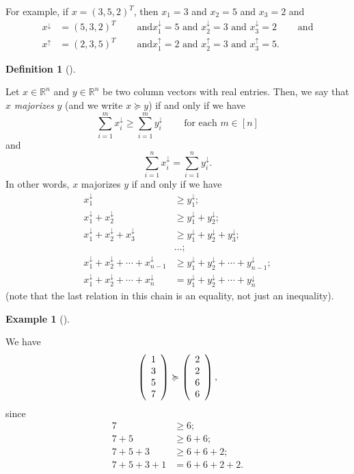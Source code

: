 \documentclass[numbers=enddot,12pt,final,onecolumn,notitlepage]{scrartcl}%
\numberwithin{exer}{subsection}
\theoremstyle{definition}
\newtheorem{defi}[theo]{Definition}
\newenvironment{definition}[1][]
{\begin{defi}[#1]\begin{leftbar}}
{\end{leftbar}\end{defi}}
\newtheorem{exam}[theo]{Example}
\newenvironment{example}[1][]
{\begin{exam}[#1]\begin{leftbar}}
{\end{leftbar}\end{exam}}
\let\sumnonlimits\sum
\renewcommand{\sum}{\sumnonlimits\limits}
\begin{document}
For example, if $x=\left(  3,5,2\right)  ^{T}$, then $x_{1}=3$ and $x_{2}=5$
and $x_{3}=2$ and%
\begin{align*}
x^{\downarrow} &  =\left(  5,3,2\right)  ^{T}\ \ \ \ \ \ \ \ \ \ \text{and
}x_{1}^{\downarrow}=5\text{ and }x_{2}^{\downarrow}=3\text{ and }%
x_{3}^{\downarrow}=2\ \ \ \ \ \ \ \ \ \ \text{and}\\
x^{\uparrow} &  =\left(  2,3,5\right)  ^{T}\ \ \ \ \ \ \ \ \ \ \text{and
}x_{1}^{\uparrow}=2\text{ and }x_{2}^{\uparrow}=3\text{ and }x_{3}^{\uparrow
}=5.
\end{align*}


\begin{definition}
\label{def.major.major}Let $x\in\mathbb{R}^{n}$ and $y\in\mathbb{R}^{n}$ be
two column vectors with real entries. Then, we say that $x$ \emph{majorizes}
$y$ (and we write $x\succcurlyeq y$) if and only if we have%
\[
\sum_{i=1}^{m}x_{i}^{\downarrow}\geq\sum_{i=1}^{m}y_{i}^{\downarrow
}\ \ \ \ \ \ \ \ \ \ \text{for each }m\in\left[  n\right]
\]
and%
\[
\sum_{i=1}^{n}x_{i}^{\downarrow}=\sum_{i=1}^{n}y_{i}^{\downarrow}.
\]
In other words, $x$ majorizes $y$ if and only if we have%
\begin{align*}
x_{1}^{\downarrow}  &  \geq y_{1}^{\downarrow};\\
x_{1}^{\downarrow}+x_{2}^{\downarrow}  &  \geq y_{1}^{\downarrow}%
+y_{2}^{\downarrow};\\
x_{1}^{\downarrow}+x_{2}^{\downarrow}+x_{3}^{\downarrow}  &  \geq
y_{1}^{\downarrow}+y_{2}^{\downarrow}+y_{3}^{\downarrow};\\
&  \ldots;\\
x_{1}^{\downarrow}+x_{2}^{\downarrow}+\cdots+x_{n-1}^{\downarrow}  &  \geq
y_{1}^{\downarrow}+y_{2}^{\downarrow}+\cdots+y_{n-1}^{\downarrow};\\
x_{1}^{\downarrow}+x_{2}^{\downarrow}+\cdots+x_{n}^{\downarrow}  &
=y_{1}^{\downarrow}+y_{2}^{\downarrow}+\cdots+y_{n}^{\downarrow}%
\end{align*}
(note that the last relation in this chain is an equality, not just an inequality).
\end{definition}

\begin{example}
We have%
\[
\left(
\begin{array}
[c]{c}%
1\\
3\\
5\\
7
\end{array}
\right)  \succcurlyeq\left(
\begin{array}
[c]{c}%
2\\
2\\
6\\
6
\end{array}
\right)  ,
\]
since%
\begin{align*}
7  &  \geq6;\\
7+5  &  \geq6+6;\\
7+5+3  &  \geq6+6+2;\\
7+5+3+1  &  =6+6+2+2.
\end{align*}

\end{example}
\end{document}
